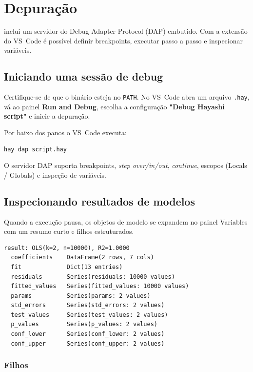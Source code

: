 \chapter{Depuração}

\hayashi{} inclui um servidor do Debug Adapter Protocol (DAP) embutido. Com a extensão do VS~Code é possível definir breakpoints, executar passo a passo e inspecionar variáveis.

\section{Iniciando uma sessão de debug}

Certifique-se de que o binário \hay{} esteja no \texttt{PATH}. No VS~Code abra um arquivo \texttt{.hay}, vá ao painel \textbf{Run and Debug}, escolha a configuração \textbf{"Debug Hayashi script"} e inicie a depuração.

Por baixo dos panos o VS~Code executa:

\begin{lstlisting}[style=inline, language=sh]
hay dap script.hay
\end{lstlisting}

O servidor DAP suporta breakpoints, \textit{step over/in/out}, \textit{continue}, escopos (Locals / Globals) e inspeção de variáveis.

\section{Inspecionando resultados de modelos}

Quando a execução pausa, os objetos de modelo se expandem no painel Variables com um resumo curto e filhos estruturados.

\begin{lstlisting}[style=inline]
result: OLS(k=2, n=10000), R2=1.0000
  coefficients    DataFrame(2 rows, 7 cols)
  fit             Dict(13 entries)
  residuals       Series(residuals: 10000 values)
  fitted_values   Series(fitted_values: 10000 values)
  params          Series(params: 2 values)
  std_errors      Series(std_errors: 2 values)
  test_values     Series(test_values: 2 values)
  p_values        Series(p_values: 2 values)
  conf_lower      Series(conf_lower: 2 values)
  conf_upper      Series(conf_upper: 2 values)
\end{lstlisting}

\subsection{Filhos}

